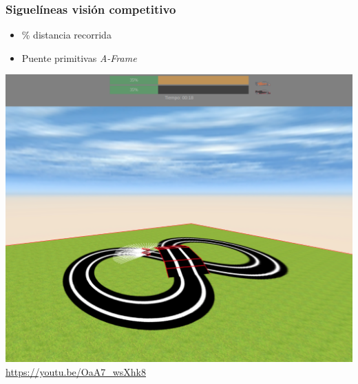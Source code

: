 \documentclass[xcolor={table}]{beamer}
\begin{document}
		\begin{frame}
			\frametitle{Siguelíneas visión competitivo}
			   \begin{minipage}{.50\textwidth}
      \begin{itemize}
          \begin{itemize}{}\itemsep5pt
              \item \% distancia recorrida
              \item Puente primitivas \textit{A-Frame}
          \end{itemize}
       \end{itemize}
    \end{minipage}
		\begin{minipage}{.48\textwidth}	
	         \href{https://youtu.be/OaA7_wsXhk8}{
            \includegraphics[scale=0.14]{img/evaluator_follow_line.png}}
            \scriptsize{\url{https://youtu.be/OaA7_wsXhk8}} 
        \end{minipage}
		\end{frame}
		
\end{document}
